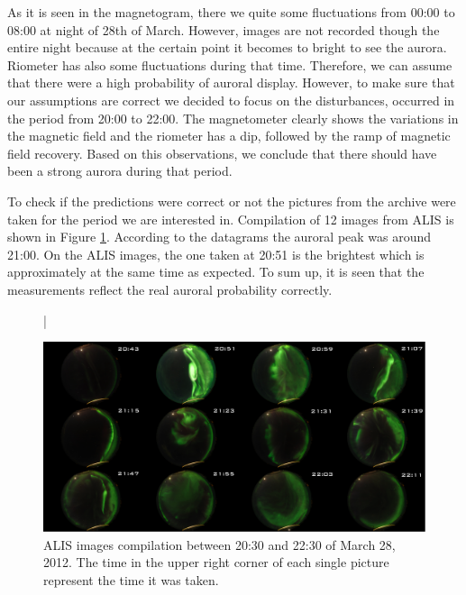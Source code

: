 \documentclass{article}
\begin{document}
As it is seen in the magnetogram, there we quite some fluctuations from 00:00 to 08:00 at night of 28th of March. However, images are not recorded though the entire night because at the certain point it becomes to bright to see the aurora. Riometer has also some fluctuations during that time. Therefore, we can assume that there were a high probability of auroral display. However, to make sure that our assumptions are correct we decided to focus on the disturbances, occurred in the period from 20:00 to 22:00. The magnetometer clearly shows the variations in the magnetic field and the riometer has a dip, followed by the ramp of magnetic field recovery. Based on this observations, we conclude that there should have been a strong aurora during that period.

To check if the predictions were correct or not the pictures from the archive were taken for the period we are interested in. Compilation of 12 images from ALIS is shown in Figure \ref{fig:ALIS}. According to the datagrams the auroral peak was around 21:00. On the ALIS images, the one taken at 20:51 is the brightest which is approximately at the same time as expected. To sum up, it is seen that the measurements reflect the real auroral probability correctly.

\begin{figure}[htbp!]
\centering|
\centerline{\includegraphics[width=1.5\textwidth]{Figures/awowa.png}}
\caption{ALIS images compilation between 20:30 and 22:30 of March 28, 2012. The time in the upper right corner of each single picture represent the time it was taken.}
\label{fig:ALIS}
\end{figure}


\end{document}
